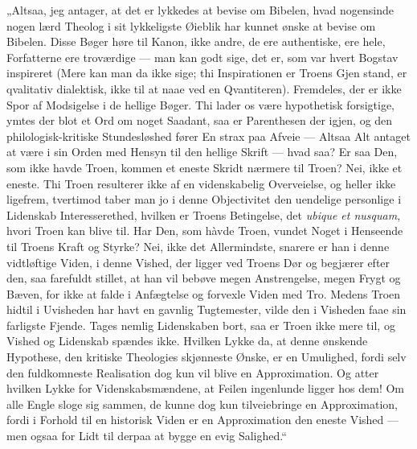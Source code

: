 „Altsaa, jeg antager, at det er lykkedes at bevise om Bibelen,
hvad nogensinde nogen lærd Theolog i sit lykkeligste Øieblik har
kunnet ønske at bevise om Bibelen. Disse Bøger høre til Kanon,
ikke andre, de ere authentiske, ere hele, Forfatterne ere
troværdige --- man kan godt sige, det er, som var hvert Bogstav
inspireret (Mere kan man da ikke sige; thi Inspirationen er Troens
Gjen%
stand, er qvalitativ dialektisk, ikke til at naae ved en
Qvantiteren). Fremdeles, der er ikke Spor af Modsigelse i de
hellige Bøger. Thi lader os være hypothetisk forsigtige, ymtes der
blot et Ord om noget Saadant, saa er Parenthesen der igjen, og den
philologisk-kritiske Stundesløshed fører En strax paa Afveie ---
Altsaa Alt antaget at være i sin Orden med Hensyn til den hellige
Skrift --- hvad saa? Er saa Den, som ikke havde Troen, kommen et
eneste Skridt nærmere til Troen? Nei, ikke et eneste. Thi Troen
resulterer ikke af en videnskabelig Overveielse, og heller ikke
ligefrem, tvertimod taber man jo i denne Objectivitet den
uendelige personlige i Lidenskab Interesserethed, hvilken er
Troens Betingelse, det \textit{ubique et nusquam}, hvori Troen kan
blive til. Har Den, som hàvde Troen, vundet Noget i Henseende til
Troens Kraft og Styrke? Nei, ikke det Allermindste, snarere er han
i denne vidtløftige Viden, i denne Vished, der ligger ved Troens
Dør og begjærer efter den, saa farefuldt stillet, at han vil
bebøve megen Anstrengelse, megen Frygt og Bæven, for ikke at falde
i Anfægtelse og forvexle Viden med Tro. Medens Troen hidtil i
Uvisheden har havt en gavnlig Tugtemester, vilde den i Visheden
faae sin farligste Fjende. Tages nemlig Lidenskaben bort, saa er
Troen ikke mere til, og Vished og Lidenskab spændes ikke. Hvilken
Lykke da, at denne ønskende Hypothese, den kritiske Theologies
skjønneste Ønske, er en Umulighed, fordi selv den fuldkomneste
Realisation dog kun vil blive en Approximation.
 Og atter hvilken Lykke for Videnskabsmændene, at Feilen ingenlunde
ligger hos dem! Om alle Engle sloge sig sammen, de kunne dog kun
tilveiebringe en Approximation, fordi i Forhold til en historisk
Viden er en Approximation den eneste Vished --- men ogsaa for Lidt
til derpaa at bygge en evig Salighed.“

